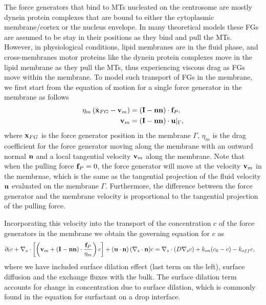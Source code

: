 \documentclass[11pt]{article}
\newcommand{\xx}{\mathbf{x}}
\begin{document}
The force generators that bind to MTs nucleated on the centrosome are mostly dynein protein complexes that are bound to either the cytoplasmic
membrane/cortex or the nucleus envelope. In many theoretical models these FGs are assumed to be stay in their positions as they bind and pull the MTs. 
However, in physiological conditions, lipid membranes are in the fluid phase, and cross-membranes motor proteins like the dynein protein complexes move
in the lipid membrane as they pull the MTs, thus experiencing viscous drag as FGs move within the membrane. To model such transport of FGs in the membrane,
we first start from the equation of motion for a single force generator in the membrane as follows
\begin{align}
\label{eq:x_fg}
\eta_m\left(\dot{\bf x}_{FG} - {\bf v}_m\right) &= \left({\bf I}-{\bf n}{\bf n}\right)\cdot {\bf f}_{P},\\
{\bf v}_m &= \left({\bf I}-{\bf n}{\bf n}\right)\cdot {\bf u}|_{\Gamma},
\end{align}
where ${\bf x}_{FG}$ is the force generator position in the membrane $\Gamma$,
$\eta_m$ is the drag coefficient for the force generator moving along the membrane with an outward normal ${\bf n}$ and a local  tangential velocity ${\bf v}_m$ along the membrane.
Note that when the pulling force ${\bf f}_P=0$,  the force generator will move at the velocity ${\bf v}_m$ in the membrnae, which is the same as the tangential projection of the fluid velocity ${\bf u}$ evaluated on the membrane $\Gamma$. Furthermore, the difference between
the force generator and the membrane velocity is proportional to the tangential projection of the pulling force.



Incorporating this velocity into the transport of the concentration $c$ of the force generators in the membrane
we obtain the governing equation for $c$ as
\begin{align}
\label{eq:c}
\partial_t c + \nabla_s\cdot \left[ \left({\bf v}_m + \left({\bf I}-{\bf n}{\bf n}\right)\cdot \frac{{\bf f}_{P}}{\eta_m}\right)c\right] + \left({\bf u}\cdot{\bf n}\right) (\nabla_s \cdot{\bf n}) c &= \nabla_s\cdot(D\nabla_s c) + k_{on}(c_0-c) -k_{off}c,
\end{align} 
where we have included surface dilation effect (last term on the left), surface diffusion and the exchange fluxes with the bulk. The surface dilation term accounts for change in concentration due to surface dilation, which is commonly found in the equation for surfactant on a drop interface.
\end{document}
